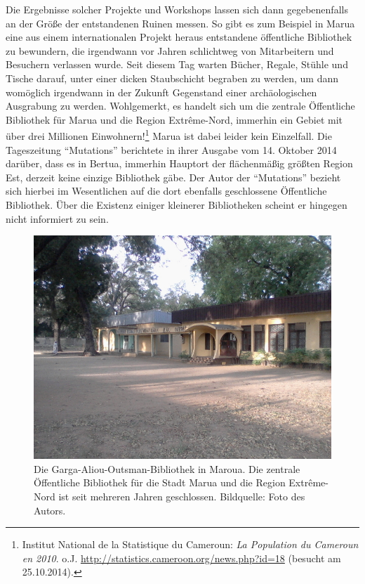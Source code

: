 \documentclass[a4paper,
fontsize=11pt,
oneside,
numbers=noperiodatend,
parskip=half-,
bibliography=totoc,
final
]{scrartcl}
\begin{document}
Die Ergebnisse solcher Projekte und Workshops lassen sich dann
gegebenenfalls an der Größe der entstandenen Ruinen messen. So gibt es
zum Beispiel in Marua eine aus einem internationalen Projekt heraus
entstandene öffentliche Bibliothek zu bewundern, die irgendwann vor
Jahren schlichtweg von Mitarbeitern und Besuchern verlassen wurde. Seit
diesem Tag warten Bücher, Regale, Stühle und Tische darauf, unter einer
dicken Staubschicht begraben zu werden, um dann womöglich irgendwann in
der Zukunft Gegenstand einer archäologischen Ausgrabung zu werden.
Wohlgemerkt, es handelt sich um die zentrale Öffentliche Bibliothek für
Marua und die Region Extrême-Nord, immerhin ein Gebiet mit über drei
Millionen Einwohnern!\footnote{Institut National de la Statistique du
  Cameroun: \emph{La Population du Cameroun en 2010}. o.J.
  \url{http://statistics.cameroon.org/news.php?id=18} (besucht am
  25.10.2014).} Marua ist dabei leider kein Einzelfall. Die Tageszeitung
\enquote{Mutations} berichtete in ihrer Ausgabe vom 14. Oktober 2014
darüber, dass es in Bertua, immerhin Hauptort der flächenmäßig größten
Region Est, derzeit keine einzige Bibliothek gäbe. Der Autor der
\enquote{Mutations} bezieht sich hierbei im Wesentlichen auf die dort
ebenfalls geschlossene Öffentliche Bibliothek. Über die Existenz einiger
kleinerer Bibliotheken scheint er hingegen nicht informiert zu sein.

\begin{figure}[htbp]
\centering
\includegraphics{img/Maroua2.jpg}
\caption{Die Garga-Aliou-Outsman-Bibliothek in Maroua. Die zentrale
Öffentliche Bibliothek für die Stadt Marua und die Region Extrême-Nord
ist seit mehreren Jahren geschlossen. Bildquelle: Foto des Autors.}
\end{figure}
\end{document}
